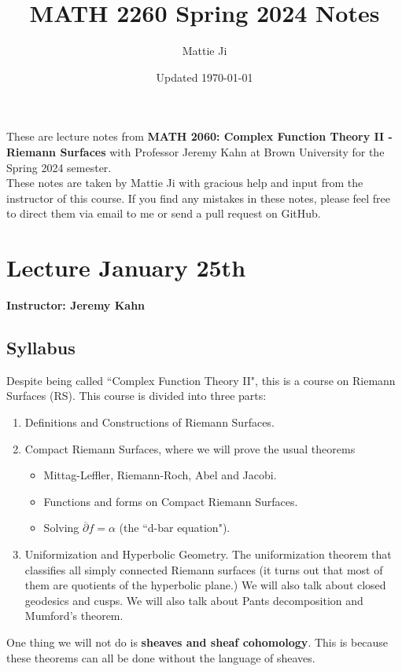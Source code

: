 \documentclass{article}
\title{MATH 2260 Spring 2024 Notes}
\author{Mattie Ji}
\date{Updated \today}
\begin{document}
\maketitle
These are lecture notes from \textbf{MATH 2060: Complex Function Theory II - Riemann Surfaces} with Professor Jeremy Kahn at Brown University for the Spring 2024 semester.\\

These notes are taken by Mattie Ji with gracious help and input from the instructor of this course. If you find any mistakes in these notes, please feel free to direct them via email to me or send a pull request on GitHub.\\
\tableofcontents

\newpage

 
\newpage
\section{Lecture January 25th}

\textbf{Instructor: Jeremy Kahn}

\subsection{Syllabus}

Despite being called ``Complex Function Theory II", this is a course on Riemann Surfaces (RS). This course is divided into three parts:
\begin{enumerate}
    \item Definitions and Constructions of Riemann Surfaces.
    \item Compact Riemann Surfaces, where we will prove the usual theorems
    \begin{itemize}
        \item Mittag-Leffler, Riemann-Roch, Abel and Jacobi.
        \item Functions and forms on Compact Riemann Surfaces.
        \item Solving $\overline{\partial} f = \alpha$ (the ``d-bar equation").
    \end{itemize}
    \item Uniformization and Hyperbolic Geometry. The uniformization theorem that classifies all simply connected Riemann surfaces (it turns out that most of them are quotients of the hyperbolic plane.) We will also talk about closed geodesics and cusps. We will also talk about Pants decomposition and Mumford's theorem.
\end{enumerate}
One thing we will not do is \textbf{sheaves and sheaf cohomology}. This is because these theorems can all be done without the language of sheaves.\\
\end{document}
